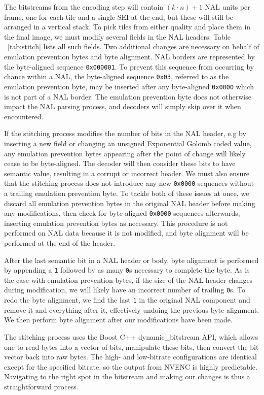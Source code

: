 The bitstreams from the encoding step will contain $(k \cdot n)+1$ NAL units per frame, one for each tile and a single SEI at the end, but these will still be arranged in a vertical stack. To pick tiles from either quality and place them in the final image, we must modify several fields in the NAL headers. Table ~\ref{tab:stitch} lists all such fields. Two additional changes are necessary on behalf of emulation prevention bytes and byte alignment. NAL borders are represented by the byte-aligned sequence \texttt{0x000001}. To prevent this sequence from occurring by chance within a NAL, the byte-aligned sequence \texttt{0x03}, referred to as the emulation prevention byte, may be inserted after any byte-aligned \texttt{0x0000} which is not part of a NAL border. The emulation prevention byte does not otherwise impact the NAL parsing process, and decoders will simply skip over it when encountered. 

If the stitching process modifies the number of bits in the NAL header, e.g by inserting a new field or changing an unsigned Exponential Golomb coded value, any emulation prevention bytes appearing after the point of change will likely cease to be byte-aligned. The decoder will then consider these bits to have semantic value, resulting in a corrupt or incorrect header. We must also ensure that the stitching process does not introduce any new \texttt{0x0000} sequences without a trailing emulation prevention byte. To tackle both of these issues at once, we discard all emulation prevention bytes in the original NAL header before making any modifications, then check for byte-aligned \texttt{0x0000} sequences afterwards, inserting emulation prevention bytes as necessary. This procedure is not performed on NAL data because it is not modified, and byte alignment will be performed at the end of the header.

After the last semantic bit in a NAL header or body, byte alignment is performed by appending a \texttt{1} followed by as many \texttt{0}s necessary to complete the byte. As is the case with emulation prevention bytes, if the size of the NAL header changes during modification, we will likely have an incorrect number of trailing \texttt{0}s. To redo the byte alignment, we find the last \texttt{1} in the original NAL component and remove it and everything after it, effectively undoing the previous byte alignment. We then perform byte alignment after our modifications have been made.

The stitching process uses the Boost C++ dynamic\_bitstream API, which allows one to read bytes into a vector of bits, manipulate these bits, then convert the bit vector back into raw bytes. The high- and low-bitrate configurations are identical except for the specified bitrate, so the output from NVENC is highly predictable. Navigating to the right spot in the bitstream and making our changes is thus a straightforward process.

